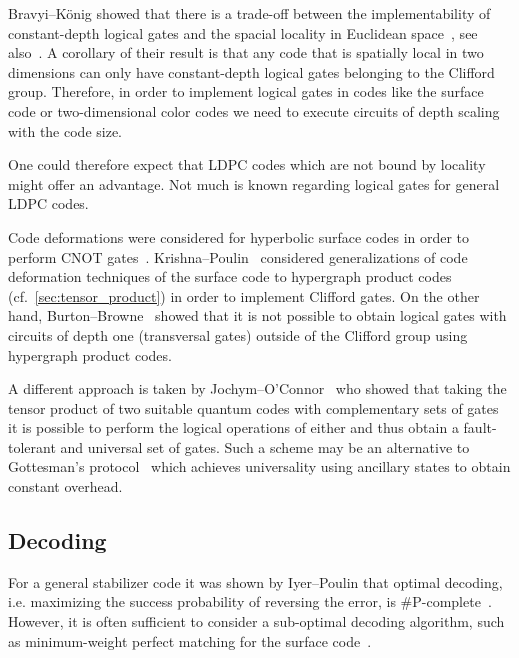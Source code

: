 \documentclass[amsmath, amssymb, floatfix, reprint, twocolumn, notitlepage, 10pt]{revtex4-1}
\begin{document}
Bravyi--K\"onig showed that there is a trade-off between the implementability of constant-depth logical gates and the spacial locality in Euclidean space~\cite{bravyi2013classification}, see also~\cite{pastawski2015fault}.
A corollary of their result is that any code that is spatially local in two dimensions can only have constant-depth logical gates belonging to the Clifford group.
Therefore, in order to implement logical gates in codes like the surface code or two-dimensional color codes we need to execute circuits of depth scaling with the code size.

One could therefore expect that LDPC codes which are not bound by locality might offer an advantage.
Not much is known regarding logical gates for general LDPC codes.

Code deformations were considered for hyperbolic surface codes in order to perform CNOT gates~\cite{breuckmann2017hyperbolic}.
Krishna--Poulin~\cite{krishna2019fault} considered generalizations of code deformation techniques of the surface code to hypergraph product codes (cf.~\cref{sec:tensor_product}) in order to implement Clifford gates.
On the other hand, Burton--Browne~\cite{burton2020limitations} showed that it is not possible to obtain logical gates with circuits of depth one (transversal gates) outside of the Clifford group using hypergraph product codes.

A different approach is taken by Jochym--O'Connor~\cite{jochym2019fault} who showed that taking the tensor product of two suitable quantum codes with complementary sets of gates it is possible to perform the logical operations of either and thus obtain a fault-tolerant and universal set of gates.
Such a scheme may be an alternative to Gottesman's protocol~\cite{gottesman2014overhead} which achieves universality using ancillary states to obtain constant overhead.


\subsection{Decoding}\label{sec:decoding}
For a general stabilizer code it was shown by Iyer--Poulin that optimal decoding, i.e. maximizing the success probability of reversing the error, is \#P-complete~\cite{iyer2015hardness}.
However, it is often sufficient to consider a sub-optimal decoding algorithm, such as minimum-weight perfect matching for the surface code~\cite{dennis2002topological}.
\end{document}
